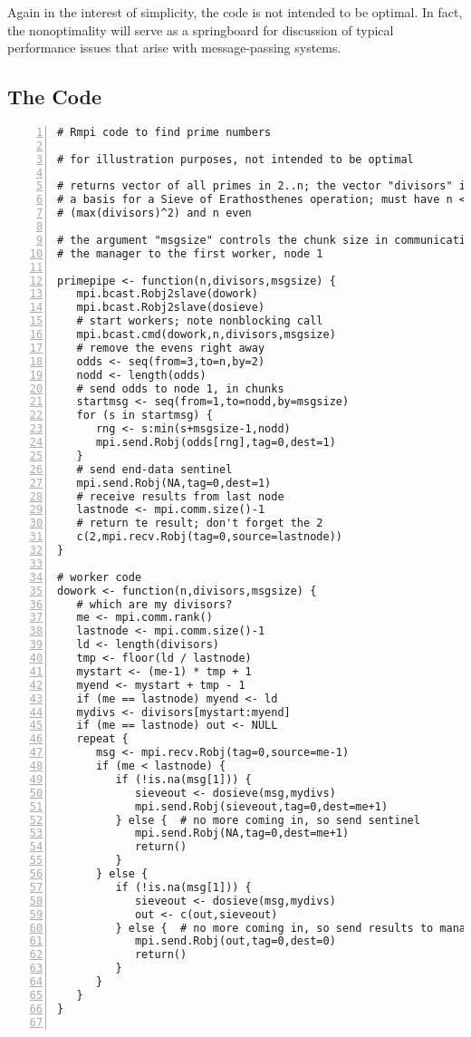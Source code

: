 Again in the interest of simplicity, the code is not intended to be
optimal.  In fact, the nonoptimality will serve as a springboard for
discussion of typical performance issues that arise with message-passing
systems.

\subsection{The Code}

\begin{lstlisting}[numbers=left]
# Rmpi code to find prime numbers

# for illustration purposes, not intended to be optimal

# returns vector of all primes in 2..n; the vector "divisors" is used as
# a basis for a Sieve of Erathosthenes operation; must have n <=
# (max(divisors)^2) and n even

# the argument "msgsize" controls the chunk size in communication from
# the manager to the first worker, node 1

primepipe <- function(n,divisors,msgsize) {
   mpi.bcast.Robj2slave(dowork)
   mpi.bcast.Robj2slave(dosieve)
   # start workers; note nonblocking call
   mpi.bcast.cmd(dowork,n,divisors,msgsize)
   # remove the evens right away
   odds <- seq(from=3,to=n,by=2)
   nodd <- length(odds)
   # send odds to node 1, in chunks 
   startmsg <- seq(from=1,to=nodd,by=msgsize)
   for (s in startmsg) {
      rng <- s:min(s+msgsize-1,nodd)
      mpi.send.Robj(odds[rng],tag=0,dest=1)
   }
   # send end-data sentinel
   mpi.send.Robj(NA,tag=0,dest=1)
   # receive results from last node
   lastnode <- mpi.comm.size()-1
   # return te result; don't forget the 2
   c(2,mpi.recv.Robj(tag=0,source=lastnode))
}

# worker code
dowork <- function(n,divisors,msgsize) {
   # which are my divisors?
   me <- mpi.comm.rank()
   lastnode <- mpi.comm.size()-1
   ld <- length(divisors)
   tmp <- floor(ld / lastnode)
   mystart <- (me-1) * tmp + 1
   myend <- mystart + tmp - 1
   if (me == lastnode) myend <- ld
   mydivs <- divisors[mystart:myend]
   if (me == lastnode) out <- NULL
   repeat {
      msg <- mpi.recv.Robj(tag=0,source=me-1)
      if (me < lastnode) {
         if (!is.na(msg[1])) {
            sieveout <- dosieve(msg,mydivs)
            mpi.send.Robj(sieveout,tag=0,dest=me+1)
         } else {  # no more coming in, so send sentinel
            mpi.send.Robj(NA,tag=0,dest=me+1)
            return()
         }
      } else {
         if (!is.na(msg[1])) {
            sieveout <- dosieve(msg,mydivs)
            out <- c(out,sieveout)
         } else {  # no more coming in, so send results to manager
            mpi.send.Robj(out,tag=0,dest=0)
            return()
         }
      }
   }
}


\end{lstlisting}
